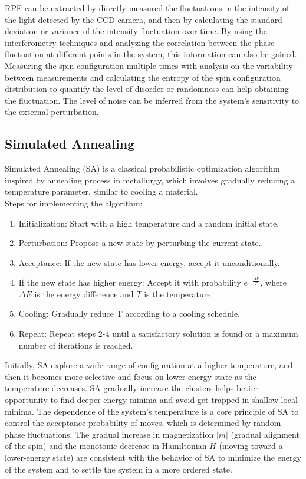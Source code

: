 RPF can be extracted by directly measured the fluctuations in the intensity of the light detected by the CCD camera, and then by calculating the standard deviation or variance of the intensity fluctuation over time. By using the interferometry techniques and analyzing the correlation between the phase fluctuation at different points in the system, this information can also be gained. Measuring the spin configuration multiple times with analysis on the variability between measurements and calculating the entropy of the spin configuration distribution to quantify the level of disorder or randomness can help obtaining the fluctuation. The level of noise can be inferred from the system's sensitivity to the external perturbation. 

\subsection{Simulated Annealing}
Simulated Annealing (SA) is a classical probabilistic optimization algorithm inspired by annealing process in metallurgy, which involves gradually reducing a temperature parameter, similar to cooling a material.\\

Steps for implementing the algorithm:
\begin{enumerate}
    \item Initialization: Start with a high temperature and a random initial state.
    \item Perturbation: Propose a new state by perturbing the current state.
    \item Acceptance: If the new state has lower energy, accept it unconditionally.
    \item If the new state has higher energy: Accept it with probability $e^{-\frac{\Delta E}{T}}$, where $\Delta E$ is the energy difference and $T$ is the temperature.
    \item Cooling: Gradually reduce T according to a cooling schedule.
    \item Repeat: Repeat steps 2-4 until a satisfactory solution is found or a maximum number of iterations is reached.
\end{enumerate}

Initially, SA explore a wide range of configuration at a higher temperature, and then it becomes more selective and focus on lower-energy state as the temperature decreases. SA gradually increase the clusters helps better opportunity to find deeper energy minima and avoid get trapped in shallow local minima. The dependence of the system's temperature is a core principle of SA to control the acceptance probability of moves, which is determined by random phase fluctuations. The gradual increase in magnetization $|m|$ (gradual alignment of the spin) and the monotonic decrease in Hamiltonian $H$ (moving toward a lower-energy state) are consistent with the behavior of SA to minimize the energy of the system and to settle the system in a more ordered state. \\


